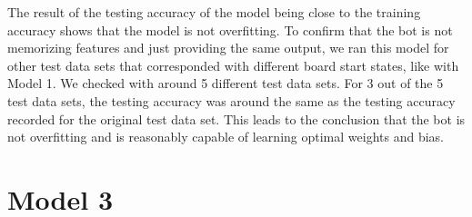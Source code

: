 \documentclass[11pt]{article}
\begin{document}
\begin{enumerate}
The result of the testing accuracy of the model being close to the training accuracy shows that the model is not overfitting. To confirm that the bot is not memorizing features and just providing the same output, we ran this model for other test data sets that corresponded with different board start states, like with Model 1. We checked with around 5 different test data sets. For 3 out of the 5 test data sets, the testing accuracy was around the same as the testing accuracy recorded for the original test data set. This leads to the conclusion that the bot is not overfitting and is reasonably capable of learning optimal weights and bias. 
\end{enumerate}





\section{Model 3}





\end{document}
